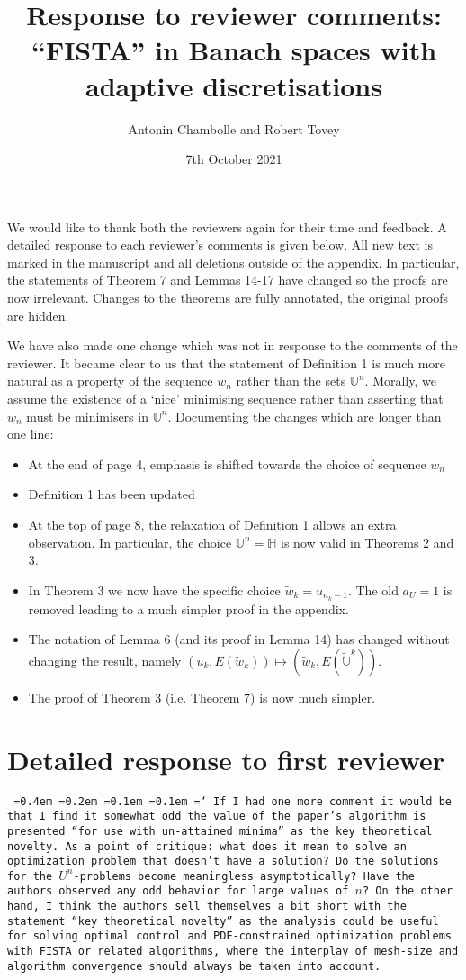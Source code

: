 \documentclass[12pt]{article}
\title{Response to reviewer comments:\\``FISTA'' in Banach spaces with adaptive discretisations}
\author{Antonin Chambolle and Robert Tovey}
\date{7th October 2021}
\newcommand*\justify{%
	\fontdimen2\font=0.4em%
	\fontdimen3\font=0.2em%
	\fontdimen4\font=0.1em%
	\fontdimen7\font=0.1em%
	\hyphenchar\font=`\-%
}
\newcommand{\review}[1]{\texttt{\justify{#1}}}
\newcommand{\F}[1]{\mathbb{#1}}
\begin{document}
\maketitle

We would like to thank both the reviewers again for their time and feedback. A detailed response to each reviewer's comments is given below. All new text is marked in the manuscript and all deletions outside of the appendix. In particular, the statements of Theorem 7 and Lemmas 14-17 have changed so the proofs are now irrelevant. Changes to the theorems are fully annotated, the original proofs are hidden.

We have also made one change which was not in response to the comments of the reviewer. It became clear to us that the statement of Definition 1 is much more natural as a property of the sequence $w_n$ rather than the sets $\F{U}^n$. Morally, we assume the existence of a `nice' minimising sequence rather than asserting that $w_n$ must be minimisers in $\F{U}^n$. Documenting the changes which are longer than one line:
\begin{itemize}
	\item At the end of page 4, emphasis is shifted towards the choice of sequence $w_n$
	\item Definition 1 has been updated
	\item At the top of page 8, the relaxation of Definition 1 allows an extra observation. In particular, the choice $\F{U}^n=\F H$ is now valid in Theorems 2 and 3.
	\item In Theorem 3 we now have the specific choice $\tilde{w}_k = u_{n_k-1}$. The old $a_U=1$ is removed leading to a much simpler proof in the appendix.
	\item The notation of Lemma 6 (and its proof in Lemma 14) has changed without changing the result, namely $(u_k,E(\tilde{w}_k))\mapsto (\tilde{w}_k, E(\tilde{\F{U}}^k))$.
	\item The proof of Theorem 3 (i.e. Theorem 7) is now much simpler.
\end{itemize}


\section{Detailed response to first reviewer}
\review{If I had one more comment it would be that I find it somewhat odd the value of the paper's algorithm is presented ``for use with un-attained minima'' as the key theoretical novelty. As a point of critique: what does it mean to solve an optimization problem that doesn't have a solution? Do the solutions for the $U^n$-problems become meaningless asymptotically? Have the authors observed any odd behavior for large values of $n$? On the other hand, I think the authors sell themselves a bit short with the statement ``key theoretical novelty'' as the analysis could be useful for solving optimal control and PDE-constrained optimization problems with FISTA or related algorithms, where the interplay of mesh-size and algorithm convergence should always be taken into account.}
\end{document}
